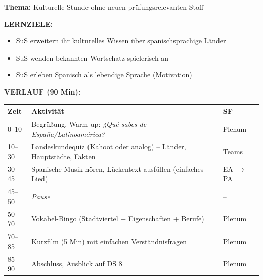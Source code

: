\documentclass[11pt, a4paper]{article}
\newcommand{\es}[1]{\textcolor{spanisch}{\textit{#1}}}
\begin{document}
\begin{pufferbox}[title={DS 7 -- PUFFER: Cultura y Diversión (Mo, 26.01.2026)}]

\textbf{Thema:} Kulturelle Stunde ohne neuen prüfungsrelevanten Stoff

\vspace{0.3cm}


\vspace{0.3cm}

\textbf{LERNZIELE:}
\begin{itemize}[leftmargin=1.5em, nosep]
    \item[Alle:] SuS erweitern ihr kulturelles Wissen über spanischsprachige Länder
    \item[Alle:] SuS wenden bekannten Wortschatz spielerisch an
    \item[Alle:] SuS erleben Spanisch als lebendige Sprache (Motivation)
\end{itemize}

\vspace{0.2cm}

\textbf{VERLAUF (90 Min):}

\begin{tabular}{|p{1.2cm}|p{9cm}|p{3.5cm}|}
\hline
\rowcolor{hellgrau}
\textbf{Zeit} & \textbf{Aktivität} & \textbf{SF} \\
\hline
0--10 & Begrüßung, Warm-up: \es{¿Qué sabes de España/Latinoamérica?} & Plenum \\
\hline
10--30 & Landeskundequiz (Kahoot oder analog) -- Länder, Hauptstädte, Fakten & Teams \\
\hline
30--45 & Spanische Musik hören, Lückentext ausfüllen (einfaches Lied) & EA $\rightarrow$ PA \\
\hline
45--50 & \textit{Pause} & -- \\
\hline
50--70 & Vokabel-Bingo (Stadtviertel + Eigenschaften + Berufe) & Plenum \\
\hline
70--85 & Kurzfilm (5 Min) mit einfachen Verständnisfragen & Plenum \\
\hline
85--90 & Abschluss, Ausblick auf DS 8 & Plenum \\
\hline
\end{tabular}

\vspace{0.2cm}


\end{pufferbox}
\end{document}
